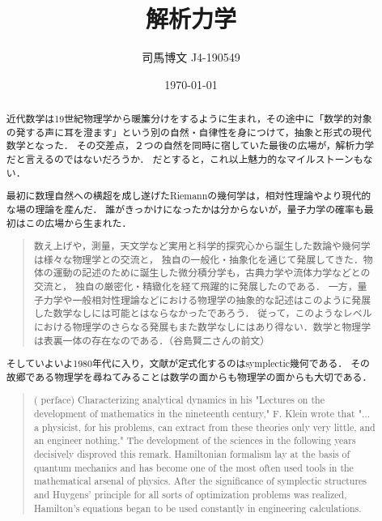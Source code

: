 \documentclass[uplatex,dvipdfmx]{jsreport}
\title{解析力学}
\author{司馬博文 J4-190549}
\date{\today}
\begin{document}
\tableofcontents

\begin{abstract}
    近代数学は19世紀物理学から暖簾分けをするように生まれ，その途中に「数学的対象の発する声に耳を澄ます」という別の自然・自律性を身につけて，抽象と形式の現代数学となった．
    その交差点，２つの自然を同時に宿していた最後の広場が，解析力学だと言えるのではないだろうか．
    だとすると，これ以上魅力的なマイルストーンもない．

    最初に数理自然への横超を成し遂げたRiemannの幾何学は，相対性理論やより現代的な場の理論を産んだ．
    誰がきっかけになったかは分からないが，量子力学の確率も最初はこの広場から生まれた．
    \begin{quotation}
        数え上げや，測量，天文学など実用と科学的探究心から誕生した数論や幾何学は様々な物理学との交流と，
        独自の一般化・抽象化を通じて発展してきた．物体の運動の記述のために誕生した微分積分学も，古典力学や流体力学などとの交流と，
        独自の厳密化・精緻化を経て飛躍的に発展したのである．
        一方，量子力学や一般相対性理論などにおける物理学の抽象的な記述はこのように発展した数学なしには可能とはならなかったであろう．
        従って，このようなレベルにおける物理学のさらなる発展もまた数学なしにはあり得ない．数学と物理学は表裏一体の存在なのである．\cite{磯崎}（谷島賢二さんの前文）
    \end{quotation}
    そしていよいよ1980年代に入り，文献\cite{Arnold}が定式化するのはsymplectic幾何である．
    その故郷である物理学を尋ねてみることは数学の面からも物理学の面からも大切である．
    \begin{quotation}
        (\cite{Arnold} perface) Characterizing analytical dynamics in his "Lectures on the development of mathematics in the nineteenth century," F. Klein wrote that "... a physicist, for his problems, can extract from these theories only very little, and an engineer nothing." The development of the sciences in the following years decisively disproved this remark.
        Hamiltonian formalism lay at the basis of quantum mechanics and has become one of the most often used tools in the mathematical arsenal of physics.
        After the significance of symplectic structures and Huygens' principle for all sorts of optimization problems was realized, Hamilton's equations began to be used constantly in engineering calculations.


\end{quotation}
\end{abstract}
\end{document}
